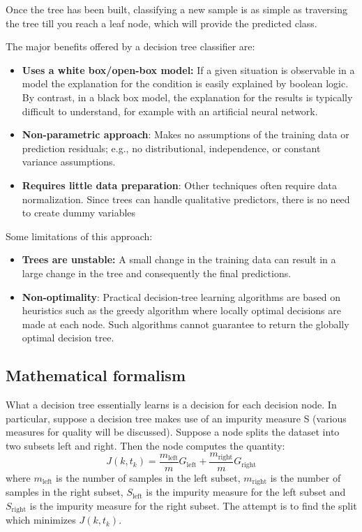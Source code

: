 \documentclass[conference]{IEEEtran}
\begin{document}
Once the tree has been built, classifying a new sample is as simple as traversing the tree till you reach a leaf node, which will provide the predicted class. 

The major benefits offered by a decision tree classifier are:
\begin{itemize}
    \item \textbf{Uses a white box/open-box model:} If a given situation is observable in a model the explanation for the condition is easily explained by boolean logic. By contrast, in a black box model, the explanation for the results is typically difficult to understand, for example with an artificial neural network.
    \item \textbf{Non-parametric approach}: Makes no assumptions of the training data or prediction residuals; e.g., no distributional, independence, or constant variance assumptions.
    \item \textbf{Requires little data preparation}: Other techniques often require data normalization. Since trees can handle qualitative predictors, there is no need to create dummy variables
\end{itemize}

Some limitations of this approach:
\begin{itemize}
    \item \textbf{Trees are unstable:} A small change in the training data can result in a large change in the tree and consequently the final predictions.
    \item \textbf{Non-optimality}: Practical decision-tree learning algorithms are based on heuristics such as the greedy algorithm where locally optimal decisions are made at each node. Such algorithms cannot guarantee to return the globally optimal decision tree.
\end{itemize}

\subsection{Mathematical formalism}

What a decision tree essentially learns is a decision for each decision node. In particular, suppose a decision tree makes use of an impurity measure S (various measures for quality will be discussed). Suppose a node splits the dataset into two subsets left and right. Then the node computes the quantity:
$$ J(k, t_k) = \frac{m_\textrm{left}}{m}G_\textrm{left} + \frac{m_\textrm{right}}{m}G_\textrm{right} $$ where $m_\textrm{left}$ is the number of samples in the left subset, $m_\textrm{right}$ is the number of samples in the right subset, $S_\textrm{left}$ is the impurity measure for the left subset and $S_\textrm{right}$ is the impurity measure for the right subset. The attempt is to find the split which minimizes $J(k, t_k)$.
\end{document}
